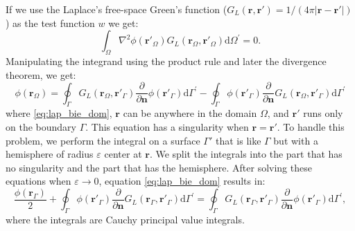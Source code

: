 If we use the Laplace's free-space Green's function ($G_L(\mathbf{r},\mathbf{r}') = 1/(4\pi|\mathbf{r}-\mathbf{r}'|)$) as the test function $w$ we
get:
%
\begin{equation} \label{eq:lap_weak2}
\int_\Omega \nabla^2 \phi(\mathbf{r}'_\Omega) G_L(\mathbf{r}_\Omega,\mathbf{r}'_\Omega) \text{d} \Omega^\prime= 0.
\end{equation}
%
Manipulating the integrand using the product rule and later the divergence 
theorem, we get:
%
\begin{equation} \label{eq:lap_bie_dom}
\phi(\mathbf{r}_\Omega) = \oint_\Gamma G_L(\mathbf{r}_\Omega,\mathbf{r}'_\Gamma)  \frac{\partial} {\partial \mathbf{n}} \phi(\mathbf{r}'_\Gamma)  \text{d} \Gamma^\prime - \oint_\Gamma \phi(\mathbf{r}'_\Gamma)  \frac{\partial}{\partial \mathbf{n}} G_L(\mathbf{r}_\Omega,\mathbf{r}'_\Gamma) \text{d} \Gamma^\prime
\end{equation}
%
where \eqref{eq:lap_bie_dom}, $\mathbf{r}$ can be anywhere in the domain $\Omega$, 
and $\mathbf{r}'$ runs only on the boundary $\Gamma$. This equation has a 
singularity when $\mathbf{r}=\mathbf{r}'$. To handle this problem, we perform the
integral on a surface $\Gamma'$ that is like $\Gamma$ but with a hemisphere of 
radius $\varepsilon$ center at $\mathbf{r}$. We split the integrals into the part
that has no singularity and the part that has the hemisphere. After solving these
equations when $\varepsilon \to 0$, equation \eqref{eq:lap_bie_dom} results in:
%
\begin{equation} \label{eq:lap_bie}
\frac{\phi(\mathbf{r}_\Gamma)}{2} +  \oint_\Gamma \phi(\mathbf{r}'_\Gamma)  \frac{\partial}{\partial \mathbf{n}} G_L(\mathbf{r}_\Gamma,\mathbf{r}'_\Gamma) \text{d} \Gamma^\prime = \oint_\Gamma G_L(\mathbf{r}_\Gamma,\mathbf{r}'_\Gamma)  \frac{\partial} {\partial \mathbf{n}} \phi(\mathbf{r}'_\Gamma)  \text{d} \Gamma^\prime,
\end{equation}
%
where the integrals are Cauchy principal value integrals.


